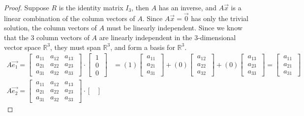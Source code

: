 \documentclass[../main.tex]{subfiles}
\begin{document}
\begin{proof}
  Suppose $R$ is the identity matrix $I_3$, then $A$ has an inverse, and $A\vec{x}$ is a linear combination of the column vectors of $A$. Since $A\vec{x}=\vec{0}$ has only the trivial solution, the column vectors of $A$ must be linearly independent.
  Since we know that the $3$ column vectors of $A$ are linearly independent in the $3$-dimensional vector space $\mathbb{R}^3$, they must span $\mathbb{R}^3$, and form a basis for $\mathbb{R}^3$.
  \begin{align*}
    A\vec{e_1} =
    \begin{bmatrix}
      \ a_{11} & a_{12} & a_{13} \ \\
      \ a_{21} & a_{22} & a_{23} \ \\
      \ a_{31} & a_{32} & a_{33} \
    \end{bmatrix} \cdot
    \begin{bmatrix}
      \ 1 \ \\
      \ 0 \ \\
      \ 0 \
    \end{bmatrix}
     & =
    (1)\begin{bmatrix}
      \ a_{11} \ \\
      \ a_{21} \ \\
      \ a_{31} \
    \end{bmatrix}
    + (0)\begin{bmatrix}
      \ a_{12} \ \\
      \ a_{22} \ \\
      \ a_{32} \
    \end{bmatrix}
    + (0)\begin{bmatrix}
      \ a_{13} \ \\
      \ a_{23} \ \\
      \ a_{33} \
    \end{bmatrix}
    = \begin{bmatrix}
      \ a_{11} \ \\
      \ a_{21} \ \\
      \ a_{31} \
    \end{bmatrix}                         \\
    A\vec{e_2} =
    \begin{bmatrix}
      \ a_{11} & a_{12} & a_{13} \ \\
      \ a_{21} & a_{22} & a_{23} \ \\
      \ a_{31} & a_{32} & a_{33} \
    \end{bmatrix} \cdot
    \begin{bmatrix}

\end{bmatrix}
\end{align*}
\end{proof}
\end{document}

